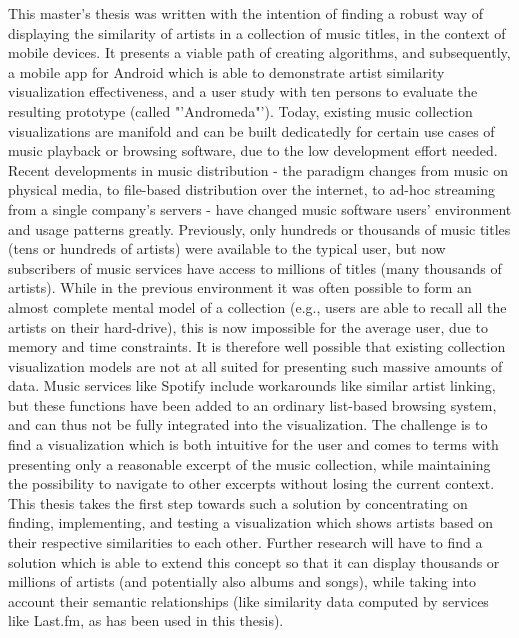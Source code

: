 This master's thesis was written with the intention of finding a robust way of displaying the similarity of artists in a collection of music titles, in the context of mobile devices. It presents a viable path of creating algorithms, and subsequently, a mobile app for Android which is able to demonstrate artist similarity visualization effectiveness, and a user study with ten persons to evaluate the resulting prototype (called "'Andromeda"').
Today, existing music collection visualizations are manifold and can be built dedicatedly for certain use cases of music playback or browsing software, due to the low development effort needed. Recent developments in music distribution - the paradigm changes from music on physical media, to file-based distribution over the internet, to ad-hoc streaming from a single company's servers - have changed music software users' environment and usage patterns greatly. Previously, only hundreds or thousands of music titles (tens or hundreds of artists) were available to the typical user, but now subscribers of music services have access to millions of titles (many thousands of artists). While in the previous environment it was often possible to form an almost complete mental model of a collection (e.g., users are able to recall all the artists on their hard-drive), this is now impossible for the average user, due to memory and time constraints. It is therefore well possible that existing collection visualization models are not at all suited for presenting such massive amounts of data. Music services like Spotify include workarounds like similar artist linking, but these functions have been added to an ordinary list-based browsing system, and can thus not be fully integrated into the visualization. The challenge is to find a visualization which is both intuitive for the user and comes to terms with presenting only a reasonable excerpt of the music collection, while maintaining the possibility to navigate to other excerpts without losing the current context. This thesis takes the first step towards such a solution by concentrating on finding, implementing, and testing a visualization which shows artists based on their respective similarities to each other. Further research will have to find a solution which is able to extend this concept so that it can display thousands or millions of artists (and potentially also albums and songs), while taking into account their semantic relationships (like similarity data computed by services like Last.fm, as has been used in this thesis).

